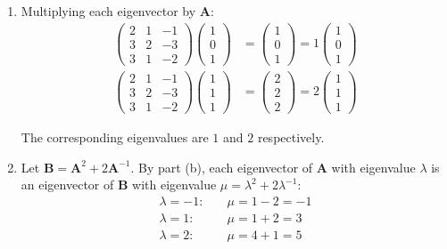 \documentclass[leqno]{article}
\begin{document}
\begin{enumerate}[
  label=\textbf{\arabic*.},
  leftmargin=*,
  topsep=0pt,
  partopsep=0pt,
  parsep=0pt
]
\begin{djsSolution}
\begin{enumerate}[label=\textbf{(\alph*)}, start=1]
  \item Multiplying each eigenvector by \(\mathbf{A}\):
\begin{align*}
\begin{pmatrix} 2 & 1 & -1 \\ 3 & 2 & -3 \\ 3 & 1 & -2 \end{pmatrix}\begin{pmatrix}1\\0\\1\end{pmatrix}&=\begin{pmatrix}1\\0\\1\end{pmatrix}=1\begin{pmatrix}1\\0\\1\end{pmatrix}\\
\begin{pmatrix} 2 & 1 & -1 \\ 3 & 2 & -3 \\ 3 & 1 & -2 \end{pmatrix}\begin{pmatrix}1\\1\\1\end{pmatrix}&=\begin{pmatrix}2\\2\\2\end{pmatrix}=2\begin{pmatrix}1\\1\\1\end{pmatrix}
\end{align*}

The corresponding eigenvalues are \(1\) and \(2\) respectively.

  \item Let \(\mathbf{B}=\mathbf{A}^2+2\mathbf{A}^{-1}\). By part (b), each eigenvector of \(\mathbf{A}\) with eigenvalue \(\lambda\) is an eigenvector of \(\mathbf{B}\) with eigenvalue \(\mu=\lambda^2+2\lambda^{-1}\):
\begin{align*}
\lambda=-1:&\quad \mu=1-2=-1\\
\lambda=1:&\quad \mu=1+2=3\\
\lambda=2:&\quad \mu=4+1=5
\end{align*}


\end{enumerate}
\end{djsSolution}
\end{enumerate}
\end{document}

